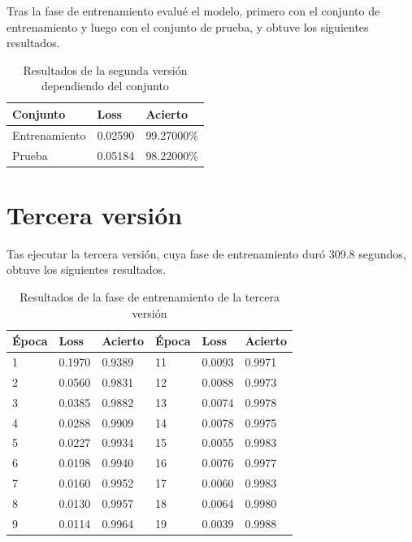 \bigskip

Tras la fase de entrenamiento evalué el modelo, primero con el conjunto de entrenamiento y luego con el conjunto de prueba, y obtuve los siguientes resultados.

\bigskip

\begin{table}[H]
  \centering
  \begin{tabular}{|l|l|l|}
    \hline
    \textbf{Conjunto} & \textbf{Loss} & \textbf{Acierto} \\
    \hline
    Entrenamiento & 0.02590 & 99.27000\%  \\
    Prueba        & 0.05184 & 98.22000\%  \\
    \hline
  \end{tabular}
  \label{tab:results-v2}
  \caption{Resultados de la segunda versión dependiendo del conjunto}
\end{table}

\bigskip

\section{Tercera versión}

Tas ejecutar la tercera versión, cuya fase de entrenamiento duró 309.8 segundos, obtuve los siguientes resultados.

\bigskip

\begin{table}[H]
  \centering
  \begin{tabular}{|l|l|l||l|l|l|}
    \hline
    \textbf{Época} & \textbf{Loss} & \textbf{Acierto} & \textbf{Época} & \textbf{Loss} & \textbf{Acierto} \\
    \hline
    1                       & 0.1970 & 0.9389 & 11 & 0.0093 & 0.9971 \\
    2                       & 0.0560 & 0.9831 & 12 & 0.0088 & 0.9973 \\
    3                       & 0.0385 & 0.9882 & 13 & 0.0074 & 0.9978 \\
    4                       & 0.0288 & 0.9909 & 14 & 0.0078 & 0.9975 \\
    5                       & 0.0227 & 0.9934 & 15 & 0.0055 & 0.9983 \\
    6                       & 0.0198 & 0.9940 & 16 & 0.0076 & 0.9977 \\
    7                       & 0.0160 & 0.9952 & 17 & 0.0060 & 0.9983 \\
    8                       & 0.0130 & 0.9957 & 18 & 0.0064 & 0.9980 \\
    9                       & 0.0114 & 0.9964 & 19 & 0.0039 & 0.9988 \\
    \hline
  \end{tabular}
  \label{tab:v3}
  \caption{Resultados de la fase de entrenamiento de la tercera versión}
\end{table}

